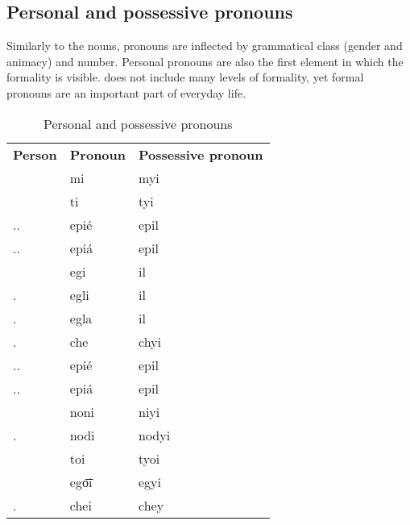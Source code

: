\subsection{Personal and possessive pronouns}

Similarly to the nouns, pronouns are inflected by grammatical class (gender and
animacy) and number. Personal pronouns are also the first element in which the
formality is visible. \andro does not include many levels of formality, yet
formal pronouns are an important part of everyday life.

\begin{table}[]
  \caption{Personal and possessive pronouns}
  \label{tab:pronouns}
  \begin{tabular}{lll}
    \textbf{Person}    & \textbf{Pronoun} & \textbf{Possessive pronoun} \\
    \Fsg{}             & mi               & myi                         \\
    \Ssg{}             & ti               & tyi                         \\
    \Ssg{}.\M{}.\Frm{} & epié             & epil                        \\
    \Ssg{}.\F{}.\Frm{} & epiá             & epil                        \\
    \Tsg{}             & egi              & il                          \\
    \Tsg{}.\M{}        & egli             & il                          \\
    \Tsg{}.\F{}        & egla             & il                          \\
    \Tsg{}.\Inan{}     & che              & chyi                        \\
    \Tsg{}.\M{}.\Frm{} & epié             & epil                        \\
    \Tsg{}.\F{}.\Frm{} & epiá             & epil                        \\
    \Fpl{}             & noni             & niyi                        \\
    \Fpl{}.\Excl{}     & nodi             & nodyi                       \\
    \Spl{}             & toi              & tyoi                        \\
    \Tpl{}             & ego͞i             & egyi                        \\
    \Tpl{}.\Inan{}     & chei             & chey
  \end{tabular}
\end{table}

